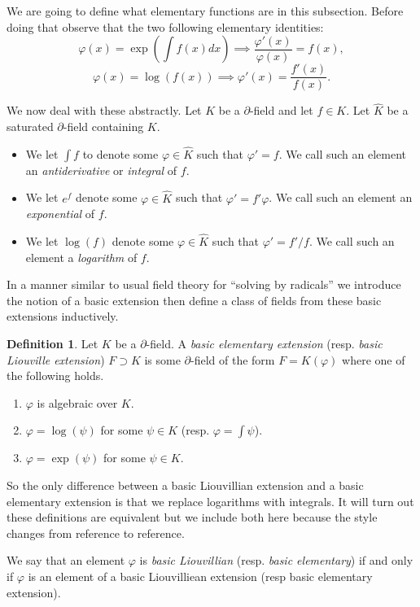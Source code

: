 \documentclass[12pt]{book}
\numberwithin{equation}{section}
\theoremstyle{definition}
\newtheorem{definition}[theorem]{Definition}
\theoremstyle{remark}
\begin{document}
We are going to define what elementary functions are in this subsection. 
Before doing that observe that the two following elementary identities:
 $$ \varphi(x) = \exp( \int f(x) dx) \implies \dfrac{\varphi'(x)}{\varphi(x)} = f(x), $$
 $$ \varphi(x) = \log(f(x)) \implies \varphi'(x) = \dfrac{f'(x)}{f(x)}.$$

We now deal with these abstractly. 
Let $K$ be a $\partial$-field and let $f\in K$.
Let $\widehat{K}$ be a saturated $\partial$-field containing $K$.
\begin{itemize}
	\item We let $\int f$ to denote some $\varphi \in \widehat{K}$ such that $\varphi' = f$. 
	We call such an element an \emph{antiderivative} or \emph{integral} of $f$. 
	\item We let $e^f$ denote some $\varphi \in \widehat{K}$ such that $\varphi' = f'\varphi$. 
	We call such an element an \emph{exponential} of $f$.
	\item We let $\log(f)$ denote some $\varphi \in \widehat{K}$ such that $\varphi'= f'/f$. 
	We call such an element a \emph{logarithm} of $f$. 
\end{itemize}

In a manner similar to usual field theory for ``solving by radicals'' we introduce the notion of a basic extension then define a class of fields from these basic extensions inductively.
\begin{definition}
	Let $K$ be a $\partial$-field. 
	A \emph{basic elementary extension} (resp. \emph{basic Liouville extension}) $F \supset K$ is some $\partial$-field of the form $F=K(\varphi)$ where one of the following holds. 
	\begin{enumerate}[topsep=0pt]
		\item $\varphi$ is algebraic over $K$.
		\item $\varphi = \log(\psi)$ for some $\psi \in K$ (resp. $\varphi = \int \psi$).
		\item $\varphi=\exp(\psi)$ for some $\psi \in K$. 
	\end{enumerate}
\end{definition}
So the only difference between a basic Liouvillian extension and a basic elementary extension is that we replace logarithms with integrals. 
It will turn out these definitions are equivalent but we include both here because the style changes from reference to reference. 

We say that an element $\varphi$ is \emph{basic Liouvillian} (resp. \emph{basic elementary}) if and only if $\varphi$ is an element of a basic Liouvilliean extension (resp basic elementary extension).
\end{document}
